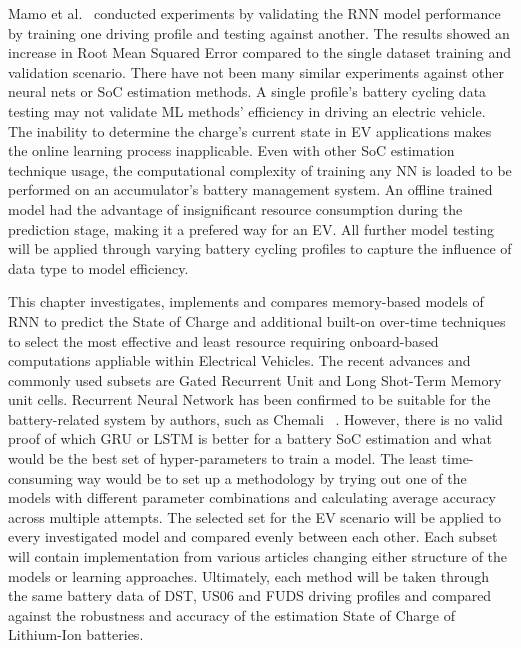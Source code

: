 %
Mamo et al.~\cite{mamo_long_2020} conducted experiments by validating the RNN model performance by training one driving profile and testing against another.
The results showed an increase in Root Mean Squared Error compared to the single dataset training and validation scenario.
There have not been many similar experiments against other neural nets or SoC estimation methods.
A single profile's battery cycling data testing may not validate ML methods' efficiency in driving an electric vehicle.
The inability to determine the charge's current state in EV applications makes the online learning process inapplicable.
Even with other SoC estimation technique usage, the computational complexity of training any NN is loaded to be performed on an accumulator's battery management system.
An offline trained model had the advantage of insignificant resource consumption during the prediction stage, making it a prefered way for an EV.
All further model testing will be applied through varying battery cycling profiles to capture the influence of data type to model efficiency.

%
This chapter investigates, implements and compares memory-based models of RNN to predict the State of Charge and additional built-on over-time techniques to select the most effective and least resource requiring onboard-based computations appliable within Electrical Vehicles.
The recent advances and commonly used subsets are Gated Recurrent Unit and Long Shot-Term Memory unit cells.
Recurrent Neural Network has been confirmed to be suitable for the battery-related system by authors, such as Chemali ~\cite{LSTM_Hochreiter1997}.
However, there is no valid proof of which GRU or LSTM is better for a battery SoC estimation and what would be the best set of hyper-parameters to train a model.
The least time-consuming way would be to set up a methodology by trying out one of the models with different parameter combinations and calculating average accuracy across multiple attempts.
The selected set for the EV scenario will be applied to every investigated model and compared evenly between each other.
Each subset will contain implementation from various articles changing either structure of the models or learning approaches.
Ultimately, each method will be taken through the same battery data of DST, US06 and FUDS driving profiles and compared against the robustness and accuracy of the estimation State of Charge of Lithium-Ion batteries.

%
%
